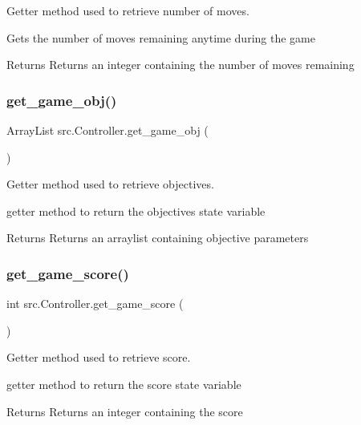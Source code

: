 Getter method used to retrieve number of moves. 

Gets the number of moves remaining anytime during the game \begin{DoxyReturn}{Returns}
Returns an integer containing the number of moves remaining 
\end{DoxyReturn}
\mbox{\label{classsrc_1_1Controller_a8d1999a35f647370310918dbe75597d8}} 
\subsubsection{\texorpdfstring{get\+\_\+game\+\_\+obj()}{get\_game\_obj()}}
{\footnotesize\ttfamily Array\+List src.\+Controller.\+get\+\_\+game\+\_\+obj (\begin{DoxyParamCaption}{ }\end{DoxyParamCaption})}



Getter method used to retrieve objectives. 

getter method to return the objectives state variable \begin{DoxyReturn}{Returns}
Returns an arraylist containing objective parameters 
\end{DoxyReturn}
\mbox{\label{classsrc_1_1Controller_a00df1a90b7ef485f2715e23df920aee4}} 
\subsubsection{\texorpdfstring{get\+\_\+game\+\_\+score()}{get\_game\_score()}}
{\footnotesize\ttfamily int src.\+Controller.\+get\+\_\+game\+\_\+score (\begin{DoxyParamCaption}{ }\end{DoxyParamCaption})}



Getter method used to retrieve score. 

getter method to return the score state variable \begin{DoxyReturn}{Returns}
Returns an integer containing the score 
\end{DoxyReturn}
\mbox{\label{classsrc_1_1Controller_a713dfa8a1f3d29238e099598b08ca30b}} 
